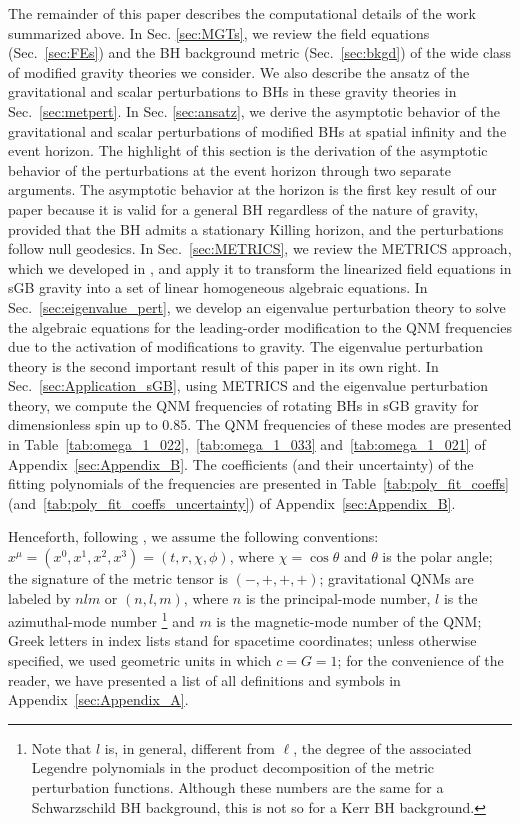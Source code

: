 \documentclass[aps,prx,amsmath,floats,floatfix,twocolumn,
  superscriptaddress,nofootinbib,showpacs]{revtex4-1}
\begin{document}
The remainder of this paper describes the computational details of the work summarized above.
In Sec. \ref{sec:MGTs}, we review the field equations (Sec.~\ref{sec:FEs}) and the BH background metric (Sec.~\ref{sec:bkgd}) of the wide class of modified gravity theories we consider. 
We also describe the ansatz of the gravitational and scalar perturbations to BHs in these gravity theories in Sec.~\ref{sec:metpert}. 
In Sec. \ref{sec:ansatz}, we derive the asymptotic behavior of the gravitational and scalar perturbations of modified BHs at spatial infinity and the event horizon. 
The highlight of this section is the derivation of the asymptotic behavior of the perturbations at the event horizon through two separate arguments. 
The asymptotic behavior at the horizon is the first key result of our paper because it is valid for a general BH regardless of the nature of gravity, provided that the BH admits a stationary Killing horizon, and the perturbations follow null geodesics. 
In Sec.~\ref{sec:METRICS}, we review the METRICS approach, which we developed in \cite{Chung:2023wkd, Chung:2023zdq}, and apply it to transform the linearized field equations in sGB gravity into a set of linear homogeneous algebraic equations.
In Sec.~\ref{sec:eigenvalue_pert}, we develop an eigenvalue perturbation theory to solve the algebraic equations for the leading-order modification to the QNM frequencies due to the activation of modifications to gravity. 
The eigenvalue perturbation theory is the second important result of this paper in its own right. 
In Sec.~\ref{sec:Application_sGB}, using METRICS and the eigenvalue perturbation theory, we compute the QNM frequencies of rotating BHs in sGB gravity for dimensionless spin up to 0.85. 
The QNM frequencies of these modes are presented in Table~\ref{tab:omega_1_022},~\ref{tab:omega_1_033} and~\ref{tab:omega_1_021} of Appendix~\ref{sec:Appendix_B}. 
The coefficients (and their uncertainty) of the fitting polynomials of the frequencies are presented in Table~\ref{tab:poly_fit_coeffs} (and~\ref{tab:poly_fit_coeffs_uncertainty}) of Appendix~\ref{sec:Appendix_B}.  

Henceforth, following \cite{Chung:2023zdq, Chung:2023wkd}, we assume the following conventions: 
$x^{\mu} = (x^0, x^1, x^2, x^3) = (t, r, \chi, \phi)$, where $\chi = \cos \theta$ and $\theta$ is the polar angle;
the signature of the metric tensor is $(-, +, +, +)$;
gravitational QNMs are labeled by $n l m$ or $(n, l, m)$, where $n$ is the principal-mode number, $l$ is the azimuthal-mode number \footnote{Note that $l$ is, in general, different from $\ell$, the degree of the associated Legendre polynomials in the product decomposition of the metric perturbation functions. Although these numbers are the same for a Schwarzschild BH background, this is not so for a Kerr BH background.} and $m$ is the magnetic-mode number of the QNM;
Greek letters in index lists stand for spacetime coordinates;
unless otherwise specified, we used geometric units in which $c=G=1$; 
for the convenience of the reader, we have presented a list of all definitions and symbols in Appendix~\ref{sec:Appendix_A}.
\end{document}
